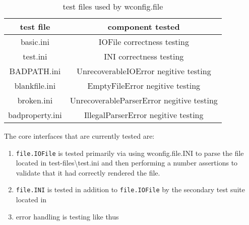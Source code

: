 \documentclass{article}
\newcommand{\monospaced}[1]{\colorbox{light-gray}{\texttt{#1}}}
\begin{document}
\begin{table}[h!]
\centering
\begin{tabular}{||c c||} 
\hline
test file & component tested \\ [0.5ex] 
\hline\hline
basic.ini & IOFile correctness testing \\
test.ini & INI correctness testing \\ 
BADPATH.ini & UnrecoverableIOError negitive testing \\ 
blankfile.ini & EmptyFileError negitive testing \\ 
broken.ini & UnrecoverableParserError negitive testing \\ 
badproperty.ini & IllegalParserError negitive testing \\ 
\hline
\end{tabular}
\caption{test files used by wconfig.file}
\label{table:1}
\end{table}

The core interfaces that are currently tested are:
\begin{enumerate}
\item \monospaced{file.IOFile} is tested primarily via using wconfig.file.INI to parse the file located in test-files\textbackslash test.ini and then performing a number assertions to validate that it had correctly rendered the file.
\item \monospaced{file.INI} is tested in addition to \monospaced{file.IOFile} by the secondary test suite located in 
\item error handling is testing like thus
\end{enumerate}

\end{document}
